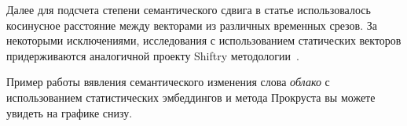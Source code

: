 \documentclass[LI,VKR]{HSEUniversity}
\begin{document}
Далее для подсчета степени семантического сдвига в статье использовалось косинусное расстояние между
векторами из различных временных срезов.
За некоторыми исключениями, исследования с использованием статических векторов
придерживаются аналогичной проекту Shiftry методологии~\cite{TahmasebiComputationalApproachesToSemanticChange}.

Пример работы вявления семантического изменения слова \textit{облако} с использованием
статистических эмбеддингов и метода Прокруста вы можете увидеть на графике снизу.

\noindent
\begin{figure}[H]
    \centering
    \hfill
    \\

\end{figure}
\end{document}
